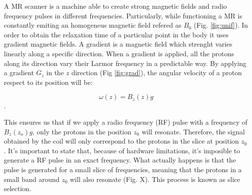 A MR scanner is a machine able to create strong magnetic fields and radio frequency pulses in different frequencies.
Particularly, while functioning a MR is constantly emiting an homogeneus magnetic field refered as $B_0$ (Fig. \ref{fig:unif}).
In order to obtain the relaxation time of a particular point in the body it uses gradient magnetic fields.
A gradient is a magnetic field which strenght varies linearly along a specific direction.
When a gradient is applied, all the protons along its direction vary their Larmor frequency in a predictable way.
By applying a gradient $G_z$ in the $z$ direction (Fig \ref{fig:grad}), the angular velocity of a proton respect to its position will be:

$$\omega(z) = B_z(z) g$$.

This ensures us that if we apply a radio frequency (RF) pulse with a frequency of $B_z(z_o) g$, only the protons in the position $z_0$ will resonate.
Therefore, the signal obtained by the coil will only correspond to the protons in the slice at position $z_0$.
It's important to state that, because of hardware limitations, it's imposible to generate a RF pulse in an exact frequency.
What actually happens is that the pulse is generated for a small slice of frequencies, meaning that the protons in a small band around $z_0$ will also resonate (Fig. X).
This process is known as slice selection.

